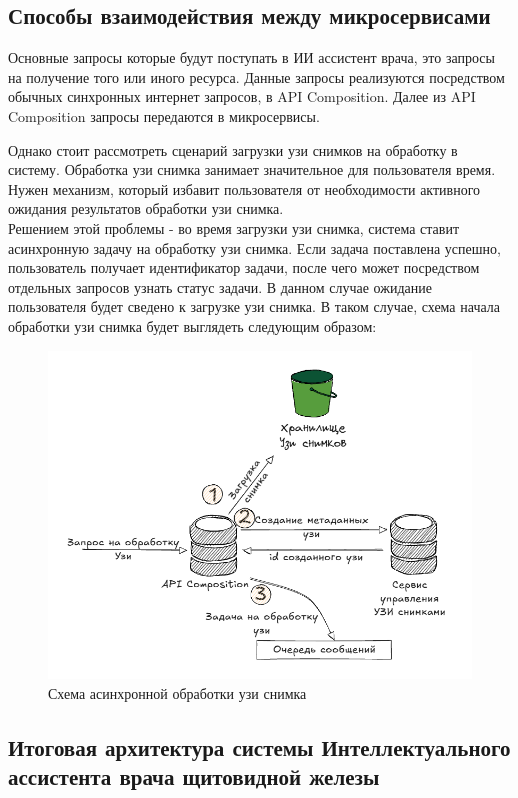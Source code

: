 \subsection{Способы взаимодействия между микросервисами}
Основные запросы которые будут поступать в ИИ ассистент врача, это запросы на получение того или иного ресурса. Данные запросы
реализуются посредством обычных синхронных интернет запросов, в API Composition. Далее из API Composition запросы передаются в микросервисы\cite{fowler2015microservices}.


Однако стоит рассмотреть сценарий загрузки узи снимков на обработку в систему. Обработка узи снимка занимает значительное для пользователя время.
Нужен механизм, который избавит пользователя от необходимости активного ожидания результатов обработки узи снимка.\\
Решением этой проблемы - во время загрузки узи снимка, система ставит асинхронную задачу на обработку узи снимка. Если 
задача поставлена успешно, пользователь получает идентификатор задачи, после чего может посредством отдельных запросов узнать статус задачи.
В данном случае ожидание пользователя будет сведено к загрузке узи снимка.
В таком случае, схема начала обработки узи снимка будет выглядеть следующим образом:
\begin{figure}[H]%
	\begin{center}
		\includegraphics[width=.6\columnwidth]{./img/new/async.png}%
	\end{center}
	\caption{Схема асинхронной обработки узи снимка}%
	\label{pic:async}%
\end{figure}

\subsection{Итоговая архитектура системы Интеллектуального ассистента врача щитовидной железы}

